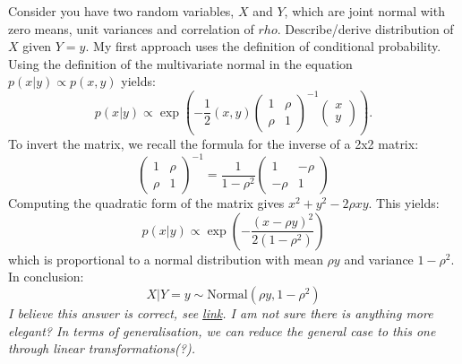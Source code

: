 \begin{qanda}
    \Q Consider you have two random variables, $X$ and $Y$, which are joint normal with zero means, unit variances and correlation of $rho$. Describe/derive distribution of $X$ given $Y = y$.
    \A My first approach uses the definition of conditional probability.
    Using the definition of the multivariate normal in the equation $p(x|y) \propto p(x,y)$ yields:
    \begin{equation*} 
        p(x | y) \propto \exp \left(  -\frac{1}{2} (x, y)  
            \begin{pmatrix} 1 &  \rho\\ \rho & 1 \end{pmatrix}^{-1}
            \begin{pmatrix} x \\ y \end{pmatrix} 
        \right).
        \end{equation*}
        To invert the matrix, we recall the formula for the inverse of a 2x2 matrix:
        \begin{equation*}
            \begin{pmatrix} 1 & \rho \\ \rho & 1 \end{pmatrix}^{-1} = 
            \frac{1}{1 - \rho^2}
            \begin{pmatrix} 1 & -\rho  \\ -\rho& 1 \end{pmatrix}
        \end{equation*}
        Computing the quadratic form of the matrix gives $x^2 + y^2 - 2 \rho x y$.
        This yields:
        \begin{equation*}
            p(x | y) \propto \exp \left(  
                -\frac{(x - \rho y)^2}{2(1-\rho^2)} 
            \right)
        \end{equation*}
        which is proportional to a normal distribution with mean $\rho y$ and variance $1 - \rho^2$.  In conclusion:
        \begin{equation*}
            X | Y = y \sim \text{Normal}(\rho y, 1 - \rho^2)
        \end{equation*}
        \emph{I believe this answer is correct, see \href{https://online.stat.psu.edu/stat414/lesson/21/21.1}{link}. I am not sure there is anything more elegant? In terms of generalisation, we can reduce the general case to this one through linear transformations(?).}
    \end{qanda}


